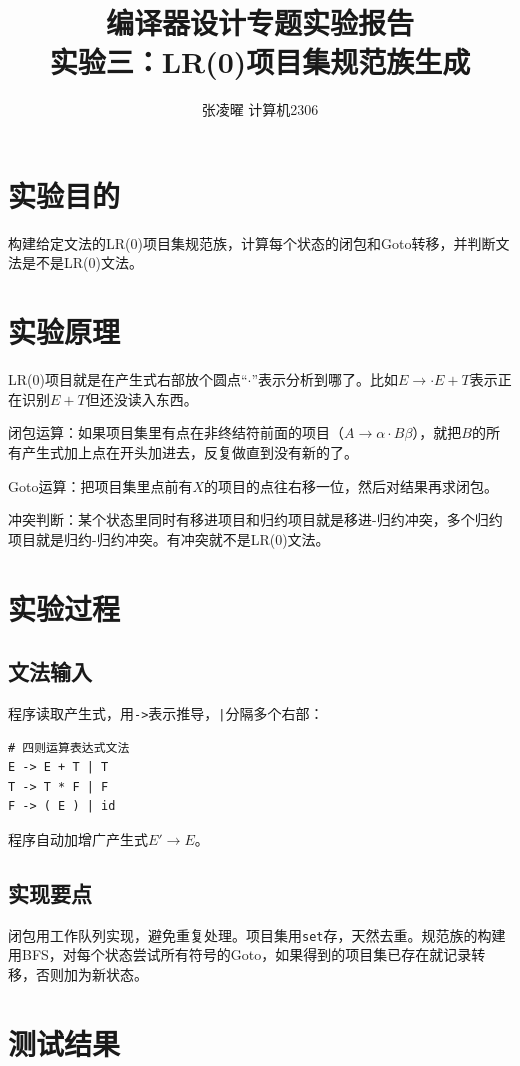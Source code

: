 \documentclass[12pt,a4paper]{ctexart}
\title{\textbf{编译器设计专题实验报告}\\[0.5em]\Large\color{themecolor}实验三：LR(0)项目集规范族生成}
\author{张凌曜 \quad 2234214014 \quad 计算机2306}
\date{}
\begin{document}
\maketitle

\section{实验目的}
构建给定文法的LR(0)项目集规范族，计算每个状态的闭包和Goto转移，并判断文法是不是LR(0)文法。

\section{实验原理}
LR(0)项目就是在产生式右部放个圆点``$\cdot$''表示分析到哪了。比如$E \to \cdot E + T$表示正在识别$E+T$但还没读入东西。

闭包运算：如果项目集里有点在非终结符前面的项目（$A \to \alpha \cdot B \beta$），就把$B$的所有产生式加上点在开头加进去，反复做直到没有新的了。

Goto运算：把项目集里点前有$X$的项目的点往右移一位，然后对结果再求闭包。

冲突判断：某个状态里同时有移进项目和归约项目就是移进-归约冲突，多个归约项目就是归约-归约冲突。有冲突就不是LR(0)文法。

\section{实验过程}

\subsection{文法输入}
程序读取产生式，用\texttt{->}表示推导，\texttt{|}分隔多个右部：

\begin{lstlisting}[language={}]
# 四则运算表达式文法
E -> E + T | T
T -> T * F | F
F -> ( E ) | id
\end{lstlisting}

程序自动加增广产生式$E' \to E$。

\subsection{实现要点}
闭包用工作队列实现，避免重复处理。项目集用\texttt{set}存，天然去重。规范族的构建用BFS，对每个状态尝试所有符号的Goto，如果得到的项目集已存在就记录转移，否则加为新状态。

\section{测试结果}
\end{document}
